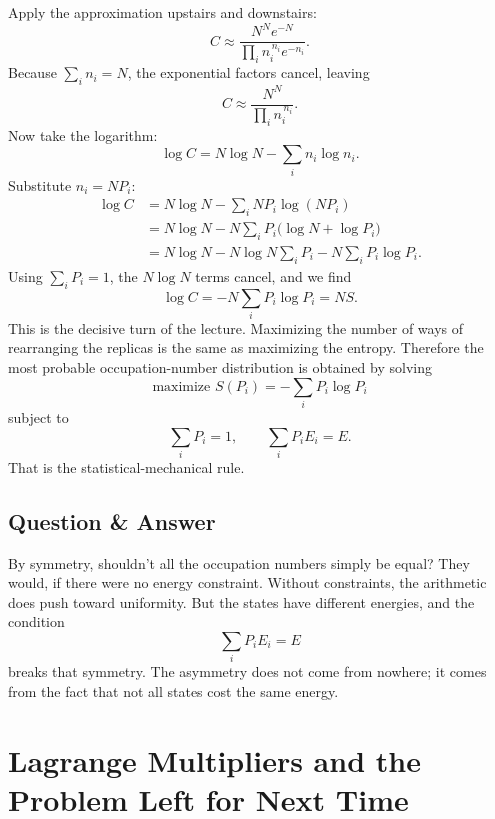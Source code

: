 Apply the approximation upstairs and downstairs:
\begin{equation}
C\approx
\frac{N^N e^{-N}}{\prod_i n_i^{\,n_i}e^{-n_i}}.
\end{equation}
Because \(\sum_i n_i=N\), the exponential factors cancel, leaving
\begin{equation}
C\approx \frac{N^N}{\prod_i n_i^{\,n_i}}.
\end{equation}
Now take the logarithm:
\begin{equation}
\log C = N\log N-\sum_i n_i\log n_i.
\end{equation}
Substitute \(n_i=NP_i\):
\begin{align}
\log C
&= N\log N-\sum_i NP_i\log(NP_i) \\
&= N\log N-N\sum_i P_i\bigl(\log N+\log P_i\bigr) \\
&= N\log N-N\log N\sum_i P_i-N\sum_i P_i\log P_i.
\end{align}
Using \(\sum_i P_i=1\), the \(N\log N\) terms cancel, and we find
\begin{equation}
\log C=-N\sum_i P_i\log P_i = NS.
\end{equation}
This is the decisive turn of the lecture. Maximizing the number of ways of rearranging the replicas is the same as maximizing the entropy. Therefore the most probable occupation-number distribution is obtained by solving
\begin{equation}
\text{maximize } S(P_i)=-\sum_i P_i\log P_i
\end{equation}
subject to
\begin{equation}
\sum_i P_i=1,
\qquad
\sum_i P_iE_i=E.
\end{equation}
That is the statistical-mechanical rule.

\subsection{Question \& Answer}

By symmetry, shouldn't all the occupation numbers simply be equal? They would, if there were no energy constraint. Without constraints, the arithmetic does push toward uniformity. But the states have different energies, and the condition
\begin{equation}
\sum_i P_iE_i=E
\end{equation}
breaks that symmetry. The asymmetry does not come from nowhere; it comes from the fact that not all states cost the same energy.

\section{Lagrange Multipliers and the Problem Left for Next Time}

